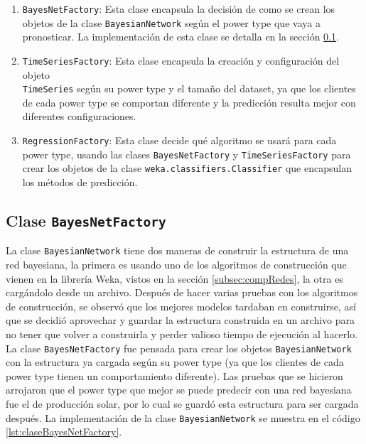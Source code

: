 \begin{enumerate}
	\item \texttt{BayesNetFactory}: Esta clase encapsula la decisión de como se crean los objetos de la clase \texttt{BayesianNetwork} según el power type que vaya a pronosticar. La implementación de esta clase se detalla en la sección \ref{subsec:claseBayesNetFactory}.
	
	\item \texttt{TimeSeriesFactory}: Esta clase encapsula la creación y configuración del objeto \\\texttt{TimeSeries} según su power type y el tamaño del dataset, ya que los clientes de cada power type se comportan diferente y la predicción resulta mejor con diferentes configuraciones.
	
	\item \texttt{RegressionFactory}: Esta clase decide qué algoritmo se usará para cada power type, usando las clases \texttt{BayesNetFactory} y \texttt{TimeSeriesFactory} para crear los objetos de la clase \texttt{weka.classifiers.Classifier} que encapsulan los métodos de predicción.
\end{enumerate} %

\subsection{Clase \texttt{BayesNetFactory}} \label{subsec:claseBayesNetFactory}
La clase \texttt{BayesianNetwork} tiene dos maneras de construir la estructura de una red bayesiana, la primera es usando uno de los algoritmos de construcción que vienen en la librería Weka, vistos en la sección \ref{subsec:compRedes}, la otra es cargándolo desde un archivo. Después de hacer varias pruebas con los algoritmos de construcción, se observó que los mejores modelos tardaban en construirse, así que se decidió aprovechar y guardar la estructura construida en un archivo para no tener que volver a construirla y perder valioso tiempo de ejecución al hacerlo. La clase \texttt{BayesNetFactory} fue pensada para crear los objetos \texttt{BayesianNetwork} con la estructura ya cargada según su power type (ya que los clientes de cada power type tienen un comportamiento diferente). Las pruebas que se hicieron arrojaron que el power type que mejor se puede predecir con una red bayesiana fue el de producción solar, por lo cual se guardó esta estructura para ser cargada después.
La implementación de la clase \texttt{BayesianNetwork} se muestra en el código \ref{lst:claseBayesNetFactory}.

